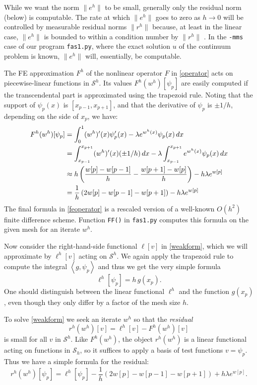\documentclass[letterpaper,final,12pt,reqno]{amsart}
\newcommand{\ip}[2]{\left<#1,#2\right>}
\begin{document}
While we want the norm $\|e^h\|$ to be small, generally only the residual norm (below) is computable.  The rate at which $\|e^h\|$ goes to zero as $h\to 0$ will be controlled by measurable residual norms $\|r^h\|$ because, at least in the linear case, $\|e^h\|$ is bounded to within a condition number by $\|r^h\|$ \cite[Chapter 2]{Bueler2021}.  In the \texttt{-mms} case of our program \texttt{fas1.py}, where the exact solution $u$ of the continuum problem is known, $\|e^h\|$ will, essentially, be computable.

The FE approximation $F^h$ of the nonlinear operator $F$ in \eqref{operator} acts on piecewise-linear functions in $\mathcal{S}^h$.  Its values $F^h(w^h)[\psi_p]$ are easily computed if the transcendental part is approximated using the trapezoid rule.  Noting that the support of $\psi_p(x)$ is $[x_{p-1},x_{p+1}]$, and that the derivative of $\psi_p$ is $\pm 1/h$, depending on the side of $x_p$, we have:
\begin{align}
  F^h(w^h)[\psi_p] &= \int_0^1 (w^h)'(x) \psi_p'(x) - \lambda e^{w^h(x)} \psi_p(x)\, dx  \label{feoperator} \\
    &= \int_{x_{p-1}}^{x_{p+1}} (w^h)'(x) (\pm 1/h)\,dx - \lambda \int_{x_{p-1}}^{x_{p+1}} e^{w^h(x)} \psi_p(x)\, dx \notag \\
    &\approx h \left(\frac{w[p]-w[p-1]}{h} - \frac{w[p+1]-w[p]}{h}\right) - h \lambda e^{w[p]}  \notag \\
    &= \frac{1}{h}\left(2w[p]-w[p-1]-w[p+1]\right) - h \lambda e^{w[p]} \notag
\end{align}
The final formula in \eqref{feoperator} is a rescaled version of a well-known $O(h^2)$ finite difference scheme.  Function \texttt{FF()} in \texttt{fas1.py} computes this formula on the given mesh for an iterate $w^h$.

Now consider the right-hand-side functional $\ell[v]$ in \eqref{weakform}, which we will approximate by $\ell^h[v]$ acting on $\mathcal{S}^h$.  We again apply the trapezoid rule to compute the integral $\ip{g}{\psi_p}$ and thus we get the very simple formula
\begin{equation}
  \ell^h[\psi_p] = h\, g(x_p). \label{ferhs}
\end{equation}
One should distinguish between the linear functional $\ell^h$ and the function $g(x_p)$, even though they only differ by a factor of the mesh size $h$.

To solve \eqref{weakform} we seek an iterate $w^h$ so that the \emph{residual}
\begin{equation}
  r^h(w^h)[v] = \ell^h[v] - F^h(w^h)[v]  \label{feresidual}
\end{equation}
is small for all $v$ in $\mathcal{S}^h$.  Like $F^h(w^h)$, the object $r^h(w^h)$ is a linear functional acting on functions in $\mathcal{S}_h$, so it suffices to apply a basis of test functions $v=\psi_p$.  Thus we have a simple formula for the residual:
\begin{equation}
  r^h(w^h)[\psi_p] = \ell^h[\psi_p] - \frac{1}{h}\left(2w[p]-w[p-1]-w[p+1]\right) + h \lambda e^{w[p]}.  \label{feresidualdetail}
\end{equation}
\end{document}
